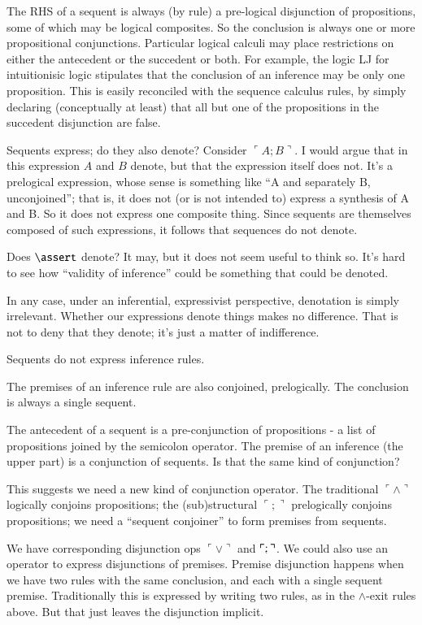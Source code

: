 The RHS of a sequent is always (by rule) a pre-logical disjunction of
propositions, some of which may be logical composites. So the
conclusion is always one or more propositional conjunctions.
Particular logical calculi may place restrictions on either the
antecedent or the succedent or both. For example, the logic LJ for
intuitionisic logic stipulates that the conclusion of an inference may
be only one proposition. This is easily reconciled with the sequence
calculus rules, by simply declaring (conceptually at least) that all
but one of the propositions in the succedent disjunction are false.

Sequents express; do they also denote? Consider \(\ulcorner
A;B\urcorner\). I would argue that in this expression \(A\) and \(B\)
denote, but that the expression itself does not. It's a prelogical
expression, whose sense is something like ``A and separately B,
unconjoined''; that is, it does not (or is not intended to) express a
synthesis of A and B. So it does not express one composite thing.
Since sequents are themselves composed of such expressions, it follows
that sequences do not denote.

Does \(\linfer\) denote? It may, but it does not seem useful to think
so. It's hard to see how ``validity of inference'' could be something
that could be denoted.

In any case, under an inferential, expressivist perspective,
denotation is simply irrelevant. Whether our expressions denote things
makes no difference. That is not to deny that they denote; it's just a
matter of indifference.

Sequents do not express inference rules.

The premises of an inference rule are also conjoined, prelogically.
The conclusion is always a single sequent.

The antecedent of a sequent is a pre-conjunction of propositions - a
list of propositions joined by the semicolon operator. The premise of
an inference (the upper part) is a conjunction of sequents. Is that
the same kind of conjunction?

This suggests we need a new kind of conjunction operator. The
traditional \(\ulcorner\land\urcorner\) logically conjoins propositions; the
(sub)structural \(\ulcorner ;\urcorner\) prelogically conjoins propositions; we need a
``sequent conjoiner'' to form premises from sequents.

We have corresponding disjunction ops \(\ulcorner\lor\urcorner\) and
\(\ulcorner\structor\urcorner\). We could also use an operator to
express disjunctions of premises. Premise disjunction happens when we
have two rules with the same conclusion, and each with a single
sequent premise. Traditionally this is expressed by writing two rules, as in the \(\land\text{-exit}\) rules above.
But that just leaves the disjunction implicit.


